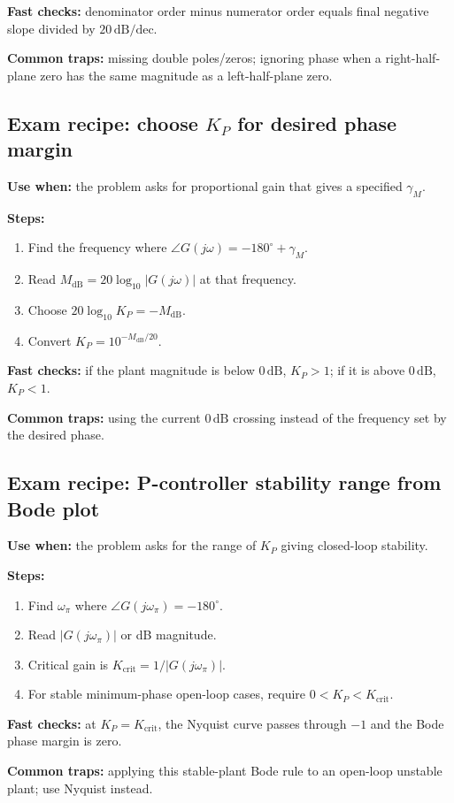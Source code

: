 \textbf{Fast checks:} denominator order minus numerator order equals final negative slope divided by \(20\,\mathrm{dB/dec}\).

\textbf{Common traps:} missing double poles/zeros; ignoring phase when a right-half-plane zero has the same magnitude as a left-half-plane zero.

\subsection{Exam recipe: choose \(K_P\) for desired phase margin}

\textbf{Use when:} the problem asks for proportional gain that gives a specified \(\gamma_M\).

\textbf{Steps:}
\begin{enumerate}
\item Find the frequency where \(\angle G(j\omega)=-180^\circ+\gamma_M\).
\item Read \(M_{\mathrm{dB}}=20\log_{10}|G(j\omega)|\) at that frequency.
\item Choose \(20\log_{10}K_P=-M_{\mathrm{dB}}\).
\item Convert \(K_P=10^{-M_{\mathrm{dB}}/20}\).
\end{enumerate}

\textbf{Fast checks:} if the plant magnitude is below \(0\,\mathrm{dB}\), \(K_P>1\); if it is above \(0\,\mathrm{dB}\), \(K_P<1\).

\textbf{Common traps:} using the current \(0\,\mathrm{dB}\) crossing instead of the frequency set by the desired phase.

\subsection{Exam recipe: P-controller stability range from Bode plot}

\textbf{Use when:} the problem asks for the range of \(K_P\) giving closed-loop stability.

\textbf{Steps:}
\begin{enumerate}
\item Find \(\omega_\pi\) where \(\angle G(j\omega_\pi)=-180^\circ\).
\item Read \(|G(j\omega_\pi)|\) or dB magnitude.
\item Critical gain is \(K_{\mathrm{crit}}=1/|G(j\omega_\pi)|\).
\item For stable minimum-phase open-loop cases, require \(0<K_P<K_{\mathrm{crit}}\).
\end{enumerate}

\textbf{Fast checks:} at \(K_P=K_{\mathrm{crit}}\), the Nyquist curve passes through \(-1\) and the Bode phase margin is zero.

\textbf{Common traps:} applying this stable-plant Bode rule to an open-loop unstable plant; use Nyquist instead.
